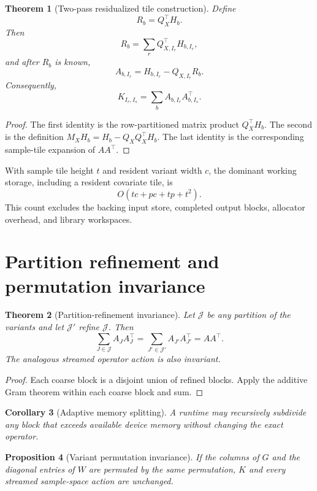\documentclass[11pt]{article}
\newtheorem{theorem}{Theorem}[section]
\newtheorem{proposition}[theorem]{Proposition}
\newtheorem{corollary}[theorem]{Corollary}
\theoremstyle{definition}
\theoremstyle{remark}
\begin{document}
\begin{theorem}[Two-pass residualized tile construction]\label{claim:final-12-1}
Define
\[
R_b=Q_X^\top H_b.
\]
Then
\[
\boxed{
R_b
=
\sum_r
Q_{X,I_r}^\top H_{b,I_r},
}
\]
and after \(R_b\) is known,
\[
\boxed{
A_{b,I_r}
=
H_{b,I_r}-Q_{X,I_r}R_b.
}
\]
Consequently,
\[
\boxed{
K_{I_r,I_s}
=
\sum_b
A_{b,I_r}A_{b,I_s}^\top.
}
\]
\end{theorem}

\begin{proof}
The first identity is the row-partitioned matrix product
\(Q_X^\top H_b\).  The second is the definition
\(M_XH_b=H_b-Q_XQ_X^\top H_b\).  The last identity is the corresponding
sample-tile expansion of \(AA^\top\).
\end{proof}

With sample tile height \(t\) and resident variant width \(c\), the dominant
working storage, including a resident covariate tile, is
\[
O(tc+pc+tp+t^2).
\]
This count excludes the backing input store, completed output blocks,
allocator overhead, and library workspaces.

\section{Partition refinement and permutation invariance}\label{sec:final-13}

\begin{theorem}[Partition-refinement invariance]\label{claim:final-13-1}
Let \(\mathcal J\) be any partition of the variants and let
\(\mathcal J'\) refine \(\mathcal J\).  Then
\[
\boxed{
\sum_{J\in\mathcal J}A_JA_J^\top
=
\sum_{J'\in\mathcal J'}A_{J'}A_{J'}^\top
=
AA^\top.
}
\]
The analogous streamed operator action is also invariant.
\end{theorem}

\begin{proof}
Each coarse block is a disjoint union of refined blocks.  Apply the additive
Gram theorem within each coarse block and sum.
\end{proof}

\begin{corollary}[Adaptive memory splitting]\label{claim:final-13-2}
A runtime may recursively subdivide any block that exceeds available device
memory without changing the exact operator.
\end{corollary}

\begin{proposition}[Variant permutation invariance]\label{claim:final-13-3}
If the columns of \(G\) and the diagonal entries of \(W\) are permuted by the
same permutation, \(K\) and every streamed sample-space action are unchanged.
\end{proposition}
\end{document}
